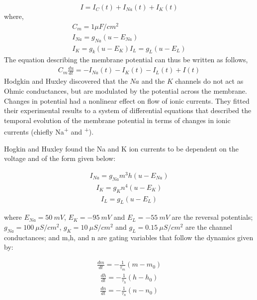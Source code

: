 \documentclass[10pt,letterpaper]{article}
\begin{document}
\begin{equation}
I = I_{C}(t) + I_{Na}(t) + I_{K}(t)
\end{equation}
where, 
\begin{eqnarray}
C_m = 1 \mu F/cm^2 \\
I_{Na} = g_{Na}(u-E_{Na})\\
I_{K} = g_{k}(u-E_K)
I_{L} = g_{L}(u-E_L)
\end{eqnarray}
The equation describing the membrane potential can thus be written as follows,
\begin{eqnarray}
\label{eq:HH}
C_m\frac{du}{dt}=−I_{Na}(t)−I_{K}(t)−I_{L}(𝑡)+I(t)
\end{eqnarray}
Hodgkin and Huxley discovered that the $Na$ and the $K$ channels do not act as Ohmic conductances, but are modulated by the potential across the membrane. 
Changes in potential had a nonlinear effect on flow of ionic currents. They fitted their experimental results to a system of differential equations that described the temporal evolution of the membrane potential in terms of changes in ionic currents (chiefly Na\textsuperscript{+} and \textsuperscript{+}). 

Hogkin and Huxley found the Na and K ion currents to be dependent on the voltage and of the form given below:

\begin{eqnarray}\label{d3_2}I_{Na} = g_{Na}m^3h(u−E_{Na})\end{eqnarray}
\begin{eqnarray}\label{d3_3}I_K = g_Kn^4(u−E_K)\end{eqnarray}
\begin{eqnarray}\label{d3_4}I_L = g_L(u−E_L)\end{eqnarray}

where $E_{Na}=50\ mV$, $E_K = -95\ mV$ and $E_L=-55\ mV$ are the reversal potentials; $g_{Na} = 100\ \mu S/cm^2$, $g_K = 10\ \mu S/cm^2$ and $g_L = 0.15\ \mu S/cm^2$ are the channel conductances; and m,h, and n are gating variables that follow the dynamics given by:

\begin{eqnarray}\label{d3_5}\frac{dm}{dt} = - \frac{1}{\tau_m}(m-m_0)\end{eqnarray}
\begin{eqnarray}\label{d3_6}\frac{dh}{dt} = - \frac{1}{\tau_h}(h-h_0)\end{eqnarray}
\begin{eqnarray}\label{d3_7}\frac{dn}{dt} = - \frac{1}{\tau_n}(n-n_0)\end{eqnarray}
\end{document}
